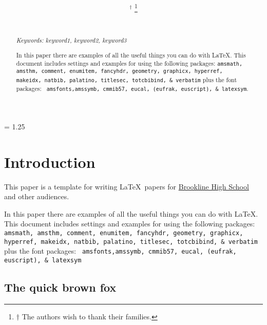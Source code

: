 \documentclass[11pt]{article}%
\title{{\bf \doctitle}}%
\author{\docauthortwo \\ \docschooltwo \\ \small{\lemail{\docemailtwo}}
 \and \docauthor$^\dagger$%
  \thanks{$\dagger$ The authors wish to thank their families.} \\ \docschool \\ \small{\lemail{\docemail}}}%
\date{} %
\begin{document}
\maketitle

\begin{multicols*}{2}
\begin{abstract}


{\em Keywords: keyword1, keyword2, keyword3 %

In this paper there are examples of all the useful things you can do
with \LaTeX. This document includes settings and examples for using
the following packages: {\tt amsmath, amsthm, comment, enumitem,
fancyhdr, geometry, graphicx, hyperref, makeidx, natbib, palatino,
titlesec, totcbibind, \& verbatim} plus the font packages: {\tt
amsfonts,amssymb, cmmib57, eucal, (eufrak, euscript), \& latexsym}.

}

\end{abstract}


\baselineskip = 1.25\baselineskip %

\section{Introduction}
\label{Introduction}

This paper is a template for writing \LaTeX\ papers for
\href{http://j.mp/psb_david_petty}{Brookline High School} and other
audiences.


In this paper there are examples of all the useful things you can do
with \LaTeX. This document includes settings and examples for using
the following packages: {\tt amsmath, amsthm, comment, enumitem,
fancyhdr, geometry, graphicx, hyperref, makeidx, natbib, palatino,
titlesec, totcbibind, \& verbatim} plus the font packages: {\tt
amsfonts,amssymb, cmmib57, eucal, (eufrak, euscript), \& latexsym}

\lipsum[1]

\subsection{The quick brown fox}
\label{The quick brown fox}


\end{multicols*}
\end{document}
